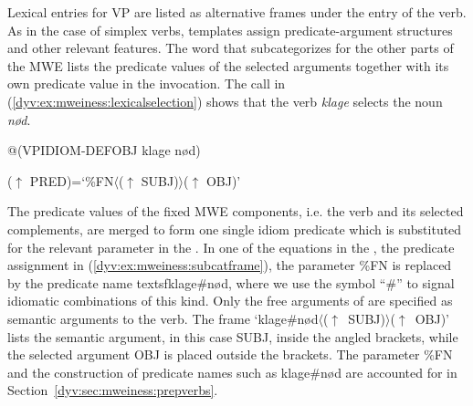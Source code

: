 \documentclass[output=paper]{langsci/langscibook}
\begin{document}
Lexical entries for VP  are listed as alternative  frames under the entry of the verb.
As in the case of simplex verbs, templates assign predicate-argument structures and other relevant features.  
The word that subcategorizes for the other parts of the MWE lists the predicate values of the selected arguments together with its own predicate value in the  invocation. 
The  call in (\ref{dyv:ex:mweiness:lexicalselection}) shows that the verb \emph{klage} selects the noun \emph{nød}. 

\ea\label{dyv:ex:mweiness:lexicalselection}
{\sffamily 
@(VPIDIOM-DEFOBJ klage nød)
}
\z

\ea\label{dyv:ex:mweiness:subcatframe}
{\sffamily
	  ($\uparrow$ PRED)=`\%FN$\langle$($\uparrow$ SUBJ)$\rangle$($\uparrow$ OBJ)'  \\
}
\z



The predicate values of the fixed MWE components, i.e. the verb and its selected complements, are merged to form one single idiom predicate which is substituted for the relevant parameter in the .
In one of the equations in the , the predicate assignment in (\ref{dyv:ex:mweiness:subcatframe}),  the parameter \%FN is replaced by the predicate name textsf{klage\#nød}, where we use the symbol ``\textsf{\#}'' to signal idiomatic combinations of this kind.
Only the free arguments of  are specified as semantic arguments to the verb.
The  frame \textsf{`klage\#nød$\langle$($\uparrow$~SUBJ)$\rangle$($\uparrow$~OBJ)'} lists the semantic argument, in this case \textsf{SUBJ}, inside the angled brackets, while the selected argument \textsf{OBJ} is placed outside the brackets.
The parameter \textsf{\%FN} and the construction of predicate names such as \textsf{klage\#nød} are accounted for in Section~\ref{dyv:sec:mweiness:prepverbs}.  
\end{document}
